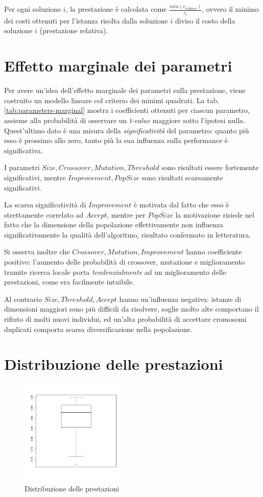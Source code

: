 \documentclass[a4paper, 10pt]{report}
\begin{document}
Per ogni soluzione $i$, la prestazione è calcolata come $\frac{min(c_{istance})}{c_{i}}$,
ovvero il minimo dei costi ottenuti per l'istanza risolta dalla soluzione
$i$ diviso il costo della soluzione $i$ (prestazione relativa).

\section{Effetto marginale dei parametri}
Per avere un'idea dell'effetto marginale dei parametri sulla prestazione,
viene costruito un modello lineare col criterio dei minimi quadrati. La
tab. \ref{tab:parameters-marginal} mostra i coefficienti ottenuti per ciascun
parametro, assieme alla probabilità di osservare un \emph{t-value}
maggiore sotto l'ipotesi nulla. Quest'ultimo dato è una misura della
\emph{significatività} del parametro: quanto più esso è prossimo allo
zero, tanto più la sua influenza sulla performance è significativa.

I parametri $Size, Crossover, Mutation, Threshold$ sono risultati essere
fortemente significativi, mentre $Improvement, PopSize$ sono risultati
scarsamente significativi.

La scarsa significatività di $Improvement$ è motivata dal fatto che
esso è strettamente correlato ad $Accept$, mentre
per $PopSize$ la motivazione risiede nel fatto che la dimensione della
popolazione effettivamente non influenza significativamente la qualità
dell'algoritmo, risultato confermato in letteratura.

Si osserva inoltre
che $Crossover, Mutation, Improvement$ hanno coefficiente positivo:
l'aumento delle probabilità di crossover, mutazione e miglioramento
tramite ricerca locale porta \emph{tendenzialmente} ad un miglioramento
delle prestazioni, come era facilmente intuibile.

Al contrario $Size, Threshold, Accept$
hanno un'influenza negativa: istanze di dimensioni maggiori sono più
difficili da risolvere, soglie molto alte comportano il rifiuto di molti
nuovi individui, ed un'alta probabilità di accettare cromosomi duplicati
comporta scarsa diversificazione nella popolazione.

\section{Distribuzione delle prestazioni}
\begin{figure}
  \centering
  \includegraphics[width=0.45\textwidth]{images/performance}
  \caption{Distribuzione delle prestazioni}
  \label{fig:calibration-performance}
\end{figure}
\end{document}
